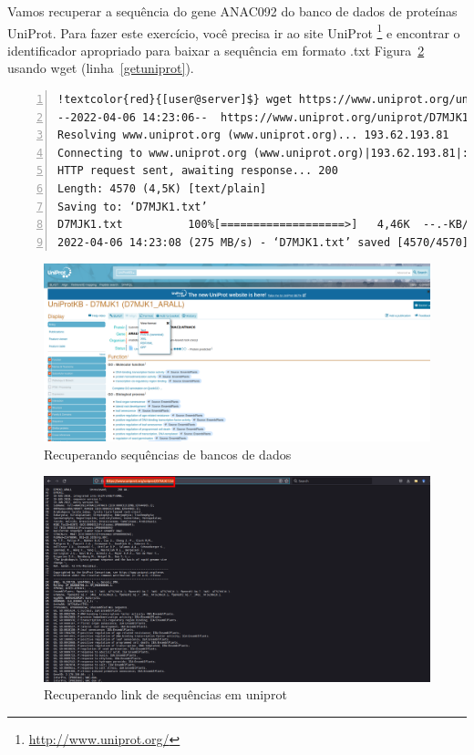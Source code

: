 \documentclass[letter,11pt]{book}
\begin{document}
Vamos recuperar a sequência do gene ANAC092 do banco de dados de proteínas UniProt. Para fazer este exercício, você precisa ir ao site UniProt \footnote{\url{http://www.uniprot.org/}} e encontrar o identificador apropriado para baixar a sequência em formato .txt Figura~\ref{link_seq} usando wget (linha~\ref{getuniprot}).

\begin{Verbatim}[commandchars=!\{\},numbers=left,label=obtendo sequência do uniprot,frame=topline,fontsize=\scriptsize]
!textcolor{red}{[user@server]$} wget https://www.uniprot.org/uniprot/D7MJK1.txt !label{getuniprot}
--2022-04-06 14:23:06--  https://www.uniprot.org/uniprot/D7MJK1.txt
Resolving www.uniprot.org (www.uniprot.org)... 193.62.193.81
Connecting to www.uniprot.org (www.uniprot.org)|193.62.193.81|:443... connected.
HTTP request sent, awaiting response... 200 
Length: 4570 (4,5K) [text/plain]
Saving to: ‘D7MJK1.txt’
D7MJK1.txt          100%[===================>]   4,46K  --.-KB/s    in 0s      
2022-04-06 14:23:08 (275 MB/s) - ‘D7MJK1.txt’ saved [4570/4570]
\end{Verbatim} 

\begin{figure}[ht]
\centering
   \includegraphics[width=12cm]{Figs/uniprot.png}
  \caption{\label{uniprot_site}Recuperando sequências de bancos de dados}
\end{figure}

\begin{figure}[ht]
\centering
   \includegraphics[width=12cm]{Figs/get_seq_link.png}
  \caption{\label{link_seq}Recuperando link de sequências em uniprot}
\end{figure}
\end{document}
